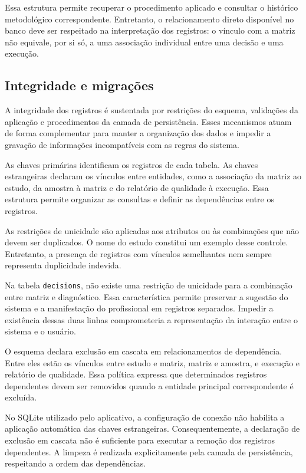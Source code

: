 Essa estrutura permite recuperar o procedimento aplicado e consultar o histórico metodológico correspondente. Entretanto, o relacionamento direto disponível no banco deve ser respeitado na interpretação dos registros: o vínculo com a matriz não equivale, por si só, a uma associação individual entre uma decisão e uma execução.

\subsection{Integridade e migrações}
\label{subsec:integridade-migracoes}

A integridade dos registros é sustentada por restrições do esquema, validações da aplicação e procedimentos da camada de persistência. Esses mecanismos atuam de forma complementar para manter a organização dos dados e impedir a gravação de informações incompatíveis com as regras do sistema.

As chaves primárias identificam os registros de cada tabela. As chaves estrangeiras declaram os vínculos entre entidades, como a associação da matriz ao estudo, da amostra à matriz e do relatório de qualidade à execução. Essa estrutura permite organizar as consultas e definir as dependências entre os registros.

As restrições de unicidade são aplicadas aos atributos ou às combinações que não devem ser duplicados. O nome do estudo constitui um exemplo desse controle. Entretanto, a presença de registros com vínculos semelhantes nem sempre representa duplicidade indevida.

Na tabela \texttt{decisions}, não existe uma restrição de unicidade para a combinação entre matriz e diagnóstico. Essa característica permite preservar a sugestão do sistema e a manifestação do profissional em registros separados. Impedir a existência dessas duas linhas comprometeria a representação da interação entre o sistema e o usuário.

O esquema declara exclusão em cascata em relacionamentos de dependência. Entre eles estão os vínculos entre estudo e matriz, matriz e amostra, e execução e relatório de qualidade. Essa política expressa que determinados registros dependentes devem ser removidos quando a entidade principal correspondente é excluída.

No SQLite utilizado pelo aplicativo, a configuração de conexão não habilita a aplicação automática das chaves estrangeiras. Consequentemente, a declaração de exclusão em cascata não é suficiente para executar a remoção dos registros dependentes. A limpeza é realizada explicitamente pela camada de persistência, respeitando a ordem das dependências.

